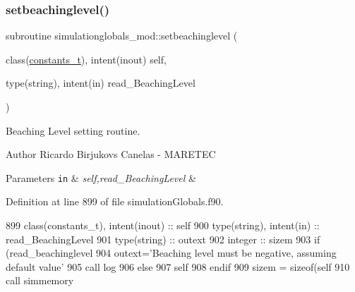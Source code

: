 \subsubsection{\texorpdfstring{setbeachinglevel()}{setbeachinglevel()}}
{\footnotesize\ttfamily subroutine simulationglobals\+\_\+mod\+::setbeachinglevel (\begin{DoxyParamCaption}\item[{class(\mbox{\hyperlink{structsimulationglobals__mod_1_1constants__t}{constants\+\_\+t}}), intent(inout)}]{self,  }\item[{type(string), intent(in)}]{read\+\_\+\+Beaching\+Level }\end{DoxyParamCaption})\hspace{0.3cm}{\ttfamily [private]}}



Beaching Level setting routine. 

\begin{DoxyAuthor}{Author}
Ricardo Birjukovs Canelas -\/ M\+A\+R\+E\+T\+EC 
\end{DoxyAuthor}

\begin{DoxyParams}[1]{Parameters}
\mbox{\tt in}  & {\em self,read\+\_\+\+Beaching\+Level} & \\
\hline
\end{DoxyParams}


Definition at line 899 of file simulation\+Globals.\+f90.


\begin{DoxyCode}
899     \textcolor{keywordtype}{class}(constants\_t), \textcolor{keywordtype}{intent(inout)} :: self
900     \textcolor{keywordtype}{type}(string), \textcolor{keywordtype}{intent(in)} :: read\_BeachingLevel
901     \textcolor{keywordtype}{type}(string) :: outext
902     \textcolor{keywordtype}{integer} :: sizem    
903     \textcolor{keywordflow}{if} (read\_beachinglevel%
904         outext=\textcolor{stringliteral}{'Beaching level must be negative, assuming default value'}
905         \textcolor{keyword}{call }log%
906     \textcolor{keywordflow}{else}        
907         self%
908 \textcolor{keywordflow}{    endif}
909     sizem = sizeof(self%
910     \textcolor{keyword}{call }simmemory%
\end{DoxyCode}
\mbox{\label{namespacesimulationglobals__mod_af0bc0b00ee3aa2ba9e47dc50daa72799}} 
